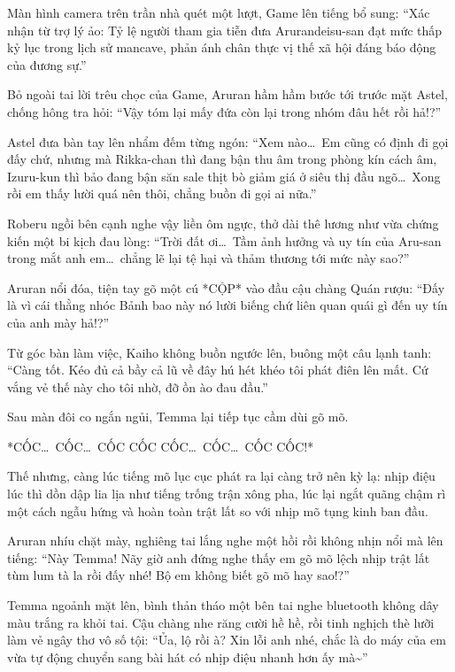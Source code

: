 \documentclass[../main.tex]{subfiles}
\begin{document}
Màn hình camera trên trần nhà quét một lượt, Game lên tiếng bổ sung: ``Xác nhận từ trợ lý ảo: Tỷ lệ người tham gia tiễn đưa Arurandeisu-san đạt mức thấp kỷ lục trong lịch sử mancave, phản ánh chân thực vị thế xã hội đáng báo động của đương sự.''

Bỏ ngoài tai lời trêu chọc của Game, Aruran hầm hầm bước tới trước mặt Astel, chống hông tra hỏi: ``Vậy tóm lại mấy đứa còn lại trong nhóm đâu hết rồi hả!?''

Astel đưa bàn tay lên nhẩm đếm từng ngón: ``Xem nào\dots\ Em cũng có định đi gọi đấy chứ, nhưng mà Rikka-chan thì đang bận thu âm trong phòng kín cách âm, Izuru-kun thì bảo đang bận săn sale thịt bò giảm giá ở siêu thị đầu ngõ\dots\ Xong rồi em thấy lười quá nên thôi, chẳng buồn đi gọi ai nữa.''

Roberu ngồi bên cạnh nghe vậy liền ôm ngực, thở dài thê lương như vừa chứng kiến một bi kịch đau lòng: ``Trời đất ơi\dots\ Tầm ảnh hưởng và uy tín của Aru-san trong mắt anh em\dots\ chẳng lẽ lại tệ hại và thảm thương tới mức này sao?''

Aruran nổi đóa, tiện tay gõ một cú *CỘP* vào đầu cậu chàng Quán rượu: ``Đấy là vì cái thằng nhóc Bảnh bao này nó lười biếng chứ liên quan quái gì đến uy tín của anh mày hả!?''


Từ góc bàn làm việc, Kaiho không buồn ngước lên, buông một câu lạnh tanh: ``Càng tốt. Kéo đủ cả bầy cả lũ về đây hú hét khéo tôi phát điên lên mất. Cứ vắng vẻ thế này cho tôi nhờ, đỡ ồn ào đau đầu.''

Sau màn đôi co ngắn ngủi, Temma lại tiếp tục cầm dùi gõ mõ.

*CỐC\dots\ CỐC\dots\ CỐC CỐC CỐC\dots\ CỐC\dots\ CỐC CỐC!*

Thế nhưng, càng lúc tiếng mõ lục cục phát ra lại càng trở nên kỳ lạ: nhịp điệu lúc thì dồn dập lia lịa như tiếng trống trận xông pha, lúc lại ngắt quãng chậm rì một cách ngẫu hứng và hoàn toàn trật lất so với nhịp mõ tụng kinh ban đầu.

Aruran nhíu chặt mày, nghiêng tai lắng nghe một hồi rồi không nhịn nổi mà lên tiếng: ``Này Temma! Nãy giờ anh đứng nghe thấy em gõ mõ lệch nhịp trật lất tùm lum tà la rồi đấy nhé! Bộ em không biết gõ mõ hay sao!?''

Temma ngoảnh mặt lên, bình thản tháo một bên tai nghe bluetooth không dây màu trắng ra khỏi tai. Cậu chàng nhe răng cười hề hề, rồi tinh nghịch thè lưỡi làm vẻ ngây thơ vô số tội: ``Ủa, lộ rồi à? Xin lỗi anh nhé, chắc là do máy của em vừa tự động chuyển sang bài hát có nhịp điệu nhanh hơn ấy mà\~{}''
\end{document}
